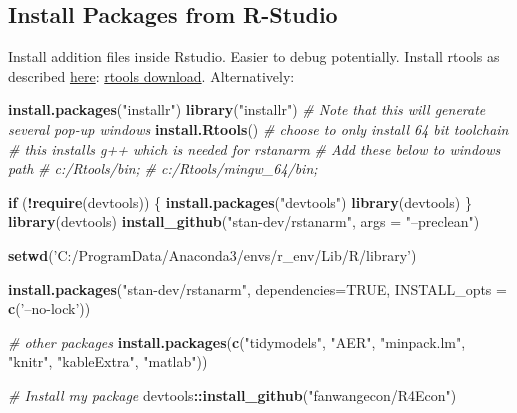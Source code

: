 \documentclass[
]{article}
\newenvironment{Shaded}{\begin{snugshade}}{\end{snugshade}}
\newcommand{\CommentTok}[1]{\textcolor[rgb]{0.56,0.35,0.01}{\textit{#1}}}
\newcommand{\ControlFlowTok}[1]{\textcolor[rgb]{0.13,0.29,0.53}{\textbf{#1}}}
\newcommand{\DataTypeTok}[1]{\textcolor[rgb]{0.13,0.29,0.53}{#1}}
\newcommand{\KeywordTok}[1]{\textcolor[rgb]{0.13,0.29,0.53}{\textbf{#1}}}
\newcommand{\NormalTok}[1]{#1}
\newcommand{\OperatorTok}[1]{\textcolor[rgb]{0.81,0.36,0.00}{\textbf{#1}}}
\newcommand{\OtherTok}[1]{\textcolor[rgb]{0.56,0.35,0.01}{#1}}
\newcommand{\StringTok}[1]{\textcolor[rgb]{0.31,0.60,0.02}{#1}}
\begin{document}
\hypertarget{install-packages-from-r-studio}{%
\subsection{Install Packages from
R-Studio}\label{install-packages-from-r-studio}}

Install addition files inside Rstudio. Easier to debug potentially.
Install rtools as described
\href{https://thecoatlessprofessor.com/programming/cpp/installing-rtools-for-compiled-code-via-rcpp/}{here}:
\href{https://cran.r-project.org/bin/windows/Rtools/}{rtools download}.
Alternatively:

\begin{Shaded}
\begin{Highlighting}[]
\KeywordTok{install.packages}\NormalTok{(}\StringTok{"installr"}\NormalTok{)}
\KeywordTok{library}\NormalTok{(}\StringTok{"installr"}\NormalTok{)}
\CommentTok{# Note that this will generate several pop-up windows}
\KeywordTok{install.Rtools}\NormalTok{()}
\CommentTok{# choose to only install 64 bit toolchain}
\CommentTok{# this installs g++ which is needed for rstanarm}
\CommentTok{# Add these below to windows path}
\CommentTok{# c:/Rtools/bin;}
\CommentTok{# c:/Rtools/mingw_64/bin;}

\ControlFlowTok{if}\NormalTok{ (}\OperatorTok{!}\KeywordTok{require}\NormalTok{(devtools)) \{}
  \KeywordTok{install.packages}\NormalTok{(}\StringTok{"devtools"}\NormalTok{)}
  \KeywordTok{library}\NormalTok{(devtools)}
\NormalTok{\}}
\KeywordTok{library}\NormalTok{(devtools)}
\KeywordTok{install_github}\NormalTok{(}\StringTok{"stan-dev/rstanarm"}\NormalTok{, }\DataTypeTok{args =} \StringTok{"--preclean"}\NormalTok{)}

\KeywordTok{setwd}\NormalTok{(}\StringTok{'C:/ProgramData/Anaconda3/envs/r_env/Lib/R/library'}\NormalTok{)}

\KeywordTok{install.packages}\NormalTok{(}\StringTok{"stan-dev/rstanarm"}\NormalTok{, }\DataTypeTok{dependencies=}\OtherTok{TRUE}\NormalTok{, }\DataTypeTok{INSTALL_opts =} \KeywordTok{c}\NormalTok{(}\StringTok{'--no-lock'}\NormalTok{))}

\CommentTok{# other packages}
\KeywordTok{install.packages}\NormalTok{(}\KeywordTok{c}\NormalTok{(}\StringTok{"tidymodels"}\NormalTok{, }\StringTok{"AER"}\NormalTok{, }\StringTok{"minpack.lm"}\NormalTok{, }\StringTok{"knitr"}\NormalTok{, }\StringTok{"kableExtra"}\NormalTok{, }\StringTok{"matlab"}\NormalTok{))}

\CommentTok{# Install my package}
\NormalTok{devtools}\OperatorTok{::}\KeywordTok{install_github}\NormalTok{(}\StringTok{"fanwangecon/R4Econ"}\NormalTok{)}
\end{Highlighting}
\end{Shaded}
\end{document}
